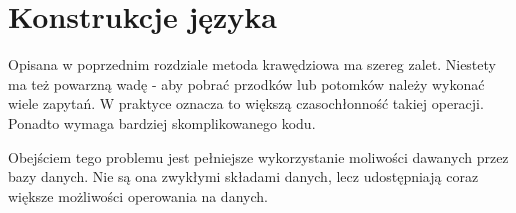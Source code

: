 \chapter{Konstrukcje języka}

% 
% 
% 


Opisana w poprzednim rozdziale metoda krawędziowa ma szereg zalet. 
Niestety ma też powarzną wadę - aby pobrać przodków lub potomków należy wykonać wiele zapytań.
W praktyce oznacza to większą czasochłonność takiej operacji. 
Ponadto wymaga bardziej skomplikowanego kodu.

Obejściem tego problemu jest pełniejsze wykorzystanie moliwości dawanych przez bazy danych.
Nie są ona zwykłymi składami danych, lecz udostępniają coraz większe możliwości operowania na danych.

